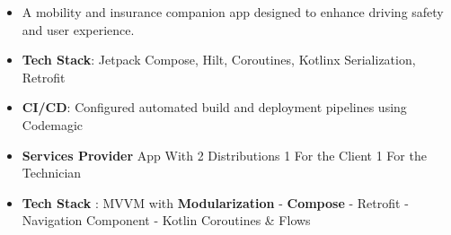 \documentclass[10pt,a4paper,ragged2e,withhyper]{altacv}
\begin{document}
\begin{paracol}{2}
%

\end{paracol}

\vspace{2px}

\vspace{2px}




\begin{itemize}
\item A mobility and insurance companion app designed to enhance driving safety and user experience.
\item \textbf{Tech Stack}: Jetpack Compose, Hilt, Coroutines, Kotlinx Serialization, Retrofit
\item \textbf{CI/CD}: Configured automated build and deployment pipelines using Codemagic
\end{itemize}
\divider


\hypertarget{samoolah}{}
\begin{itemize}
\item \textbf{Services Provider} App With 2 Distributions 1 For the Client 1 For the Technician
\item \textbf{Tech Stack} : MVVM with \textbf{Modularization} - \textbf{Compose} - Retrofit - Navigation Component - Kotlin Coroutines \& Flows
\end{itemize}
\divider
\end{document}

